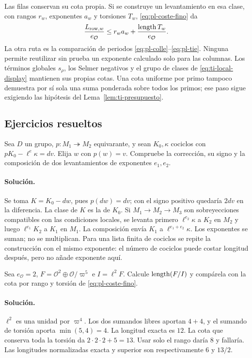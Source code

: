 Las filas conservan su cota propia. Si se construye un
levantamiento en esa clase, con rangos $r_w$, exponentes $a_w$
y torsiones $T_w$, \eqref{eq:pl-coste-fino} da
\[
 \frac{L_{{\rm row},w}}{e_{\mathcal O}}
       \le r_w a_w+\frac{\operatorname{length} T_w}{e_{\mathcal O}}.
\]
La otra ruta es la comparación de periodos
\eqref{eq:pl-colle}--\eqref{eq:pl-tie}. Ninguna permite reutilizar
sin prueba un exponente calculado solo para las columnas.
Los términos globales $s_\rho$, los Selmer negativos y el grupo
de clases de \eqref{eq:ti-local-display} mantienen sus propias
cotas. Una cota uniforme por primo tampoco demuestra por sí
sola una suma ponderada sobre todos los primos; ese paso sigue
exigiendo las hipótesis del Lema~\ref{lem:ti-presupuesto}.

\subsection{Ejercicios resueltos}

\begin{ejercicio}
\label{ex:lu-1}
Sea $D$ un grupo, $p:M_1\twoheadrightarrow M_2$ equivarante,
y sean $K_0,\kappa$ cociclos con
$pK_0-\ell^e\kappa=dv$. Elija $w$ con $p(w)=v$.
Compruebe la corrección, su signo y la composición de dos
levantamientos de exponentes $e_1,e_2$.
\end{ejercicio}
\paragraph{Solución.}
Se toma $K=K_0-dw$, pues $p(dw)=dv$; con el signo positivo
quedaría $2dv$ en la diferencia. La clase de $K$ es la de $K_0$.
Si $M_1\to M_2\to M_3$ son sobreyecciones compatibles con las
condiciones locales, se levanta primero
$\ell^{e_2}\kappa$ a $K_2$ en $M_2$ y luego
$\ell^{e_1}K_2$ a $K_1$ en $M_1$. La composición envía
$K_1$ a $\ell^{e_1+e_2}\kappa$. Los exponentes se suman;
no se multiplican. Para una lista finita de cociclos se repite
la construcción con el mismo exponente: el número de cociclos
puede costar longitud después, pero no añade exponente aquí.

\begin{ejercicio}
\label{ex:lu-2}
Sea $e_{\mathcal O}=2$,
$F=\mathcal O^2\oplus\mathcal O/\varpi^5$ e $I=\ell^2F$.
Calcule $\operatorname{length}(F/I)$ y compárela con la cota por rango y
torsión de \eqref{eq:pl-coste-fino}.
\end{ejercicio}
\paragraph{Solución.}
$\ell^2$ es una unidad por $\varpi^4$. Los dos sumandos libres
aportan $4+4$, y el sumando de torsión aporta $\min(5,4)=4$.
La longitud exacta es $12$. La cota que conserva toda la torsión
da $2\cdot2\cdot2+5=13$. Usar solo el rango daría $8$ y
fallaría. Las longitudes normalizadas exacta y superior son
respectivamente $6$ y $13/2$.

